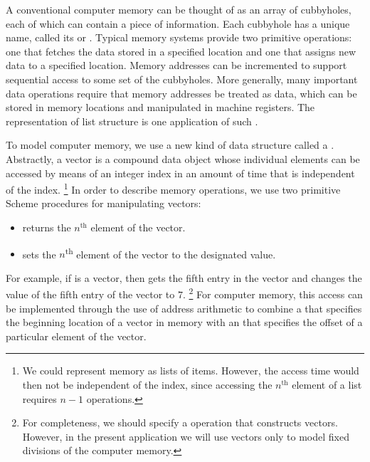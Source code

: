 A conventional computer memory can be thought of as an array of cubbyholes, each of which can contain a piece of information.
Each cubbyhole has a unique name, called its  or .
Typical memory systems provide two primitive operations:
one that fetches the data stored in a specified location and one that assigns new data to a specified location.
Memory addresses can be incremented to support sequential access to some set of the cubbyholes.
More generally, many important data operations require that memory addresses be treated as data, which can be stored in memory locations and manipulated in machine registers.
The representation of list structure is one application of such .

To model computer memory, we use a new kind of data structure called a .
Abstractly, a vector is a compound data object whose individual elements can be accessed by means of an integer index in an amount of time that is independent of the index.%
\footnote{
	We could represent memory as lists of items.
	However, the access time would then not be independent of the index, since accessing the \( n^{\mathrm{th}} \) element of a list requires \( n - 1 \)  operations.
}
In order to describe memory operations, we use two primitive Scheme procedures for manipulating vectors:
\begin{itemize}

	\item
		 returns the \( n^{\mathrm{th}} \) element of the vector.

	\item
		 sets the \( n \)\textsuperscript{th} element of the vector to the designated value.

\end{itemize}
For example, if  is a vector, then  gets the fifth entry in the vector  and  changes the value of the fifth entry of the vector  to \( 7 \).%
\footnote{
	For completeness, we should specify a  operation that constructs vectors.
	However, in the present application we will use vectors only to model fixed divisions of the computer memory.
}
For computer memory, this access can be implemented through the use of address arithmetic to combine a  that specifies the beginning location of a vector in memory with an  that specifies the offset of a particular element of the vector.



